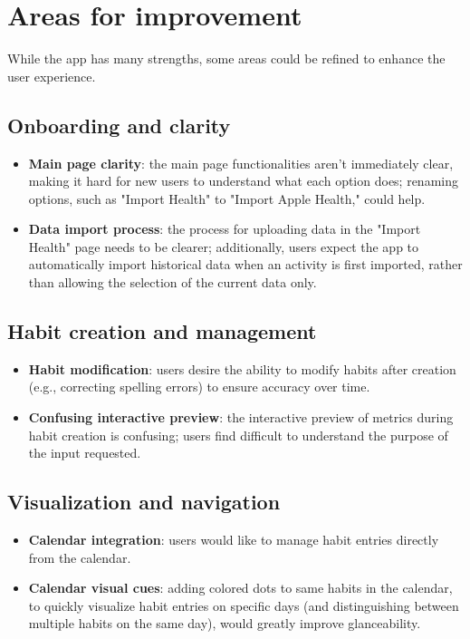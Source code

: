 \documentclass{article}
\begin{document}
\section{Areas for improvement}

While the app has many strengths, some areas could be refined to enhance the user experience.

\subsection{Onboarding and clarity}

\begin{itemize}
	\item \textbf{Main page clarity}: the main page functionalities aren't immediately clear, making it hard for new users to understand what each option does; renaming options, such as "Import Health" to "Import Apple Health," could help.
	\item \textbf{Data import process}: the process for uploading data in the "Import Health" page needs to be clearer; additionally, users expect the app to automatically import historical data when an activity is first imported, rather than allowing the selection of the current data only.
\end{itemize}

\subsection{Habit creation and management}

\begin{itemize}
	\item \textbf{Habit modification}: users desire the ability to modify habits after creation (e.g., correcting spelling errors) to ensure accuracy over time.
	\item \textbf{Confusing interactive preview}: the interactive preview of metrics during habit creation is confusing; users find difficult to understand the purpose of the input requested.
\end{itemize}

\subsection{Visualization and navigation}

\begin{itemize}
	\item \textbf{Calendar integration}: users would like to manage habit entries directly from the calendar.
	\item \textbf{Calendar visual cues}: adding colored dots to same habits in the calendar, to quickly visualize habit entries on specific days (and distinguishing between multiple habits on the same day), would greatly improve glanceability.
\end{itemize}
\end{document}
